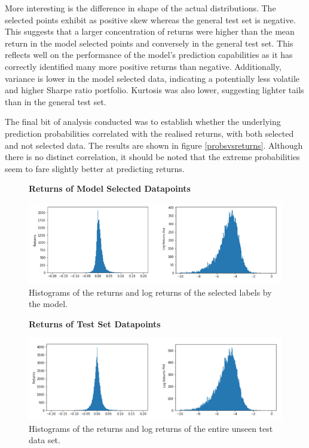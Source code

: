 \documentclass[10pt,onecolumn,letterpaper]{article}
\newcommand*{\figuretitle}[1]{%
    {\centering%
    \textbf{#1}%
    \par\medskip}%
}
\begin{document}
More interesting is the difference in shape of the actual distributions. The selected points exhibit as positive skew whereas the general test set is negative. This suggests that a larger concentration of returns were higher than the mean return in the model selected points and conversely in the general test set. This reflects well on the performance of the model's prediction capabilities as it has correctly identified many more positive returns than negative. Additionally, variance is lower in the model selected data, indicating a potentially less volatile and higher Sharpe ratio portfolio. Kurtosis was also lower, suggesting lighter tails than in the general test set. 

The final bit of analysis conducted was to establish whether the underlying prediction probabilities correlated with the realised returns, with both selected and not selected data. The results are shown in figure \ref{probsvsreturns}. Although there is no distinct correlation, it should be noted that the extreme probabilities seem to fare slightly better at predicting returns.

\begin{figure}[!hbt!]
\figuretitle{Returns of Model Selected Datapoints} 
\centering
\includegraphics[width=16.5cm]{results_distributions.png}
\caption{Histograms of the returns and log returns of the selected labels by the model.}
\end{figure}

\begin{figure}[!hbt!]
\figuretitle{Returns of Test Set Datapoints} 
\centering
\includegraphics[width=16.5cm]{test_returns.png}
\caption{Histograms of the returns and log returns of the entire unseen test data set.}
\end{figure}
\end{document}
